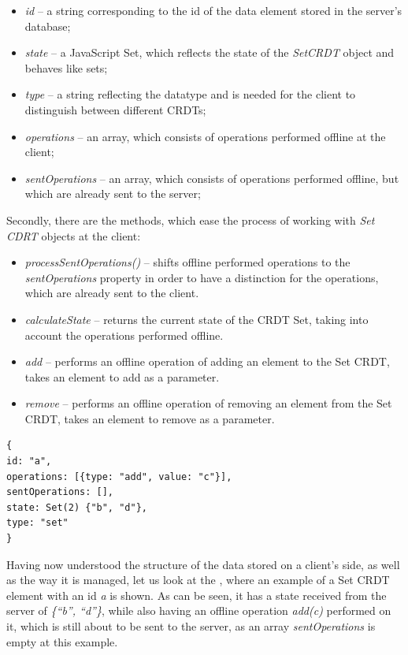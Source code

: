          \begin{itemize}
         \item \textit{id} -- a string corresponding to the id of the data element stored in the server's database;
         \item \textit{state} -- a JavaScript Set, which reflects the state of the \textit{SetCRDT} object and behaves like sets;
	\item \textit{type} -- a string reflecting the datatype and is needed for the client to distinguish between different CRDTs;
	\item \textit{operations} -- an array, which consists of operations performed offline at the client;
	\item \textit{sentOperations} -- an array, which consists of operations performed offline, but which are already sent to the server;
     \end{itemize}

Secondly, there are the methods, which ease the process of working with \textit{Set CDRT} objects at the client: 

         \begin{itemize}
         \item \textit{processSentOperations()} -- shifts offline performed operations to the \textit{sentOperations} property in order to have a distinction for the operations, which are already sent to the client.
         \item \textit{calculateState} -- returns the current state of the CRDT Set, taking into account the operations performed offline.
         \item \textit{add} -- performs an offline operation of adding an element to the Set CRDT, takes an element to add as a parameter.
          \item \textit{remove} -- performs an offline operation of removing an element from the Set CRDT, takes an element to remove as a parameter.
     \end{itemize}

\begin{lstlisting}[caption={An example of a \textit{SetCRDT} object, stored on a client's side.}, label={lst:dev8}]
{
id: "a",
operations: [{type: "add", value: "c"}],
sentOperations: [],
state: Set(2) {"b", "d"},
type: "set"
}
\end{lstlisting}
     
Having now understood the structure of the data stored on a client's side, as well as the way it is managed, let us look at the , where an example of a Set CRDT element with an id \textit{a} is shown. As can be seen, it has a state received from the server of \textit{\{``b'', ``d''\}}, while also having an offline operation \textit{add(c)} performed on it, which is still about to be sent to the server, as an array \textit{sentOperations} is empty at this example.

